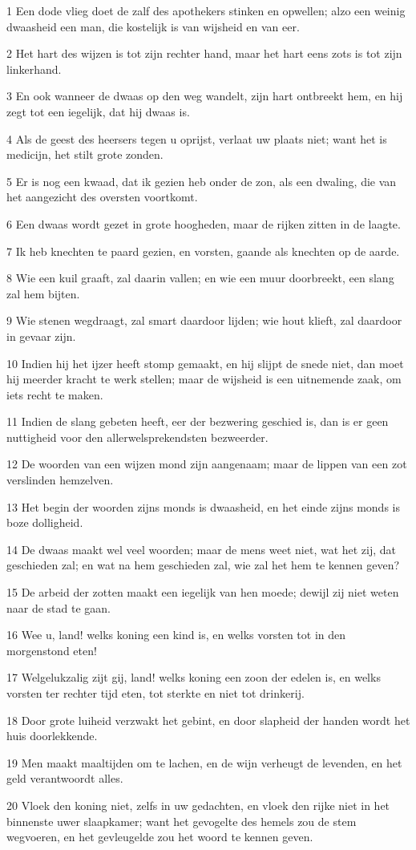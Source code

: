 \par 1 Een dode vlieg doet de zalf des apothekers stinken en opwellen; alzo een weinig dwaasheid een man, die kostelijk is van wijsheid en van eer.
\par 2 Het hart des wijzen is tot zijn rechter hand, maar het hart eens zots is tot zijn linkerhand.
\par 3 En ook wanneer de dwaas op den weg wandelt, zijn hart ontbreekt hem, en hij zegt tot een iegelijk, dat hij dwaas is.
\par 4 Als de geest des heersers tegen u oprijst, verlaat uw plaats niet; want het is medicijn, het stilt grote zonden.
\par 5 Er is nog een kwaad, dat ik gezien heb onder de zon, als een dwaling, die van het aangezicht des oversten voortkomt.
\par 6 Een dwaas wordt gezet in grote hoogheden, maar de rijken zitten in de laagte.
\par 7 Ik heb knechten te paard gezien, en vorsten, gaande als knechten op de aarde.
\par 8 Wie een kuil graaft, zal daarin vallen; en wie een muur doorbreekt, een slang zal hem bijten.
\par 9 Wie stenen wegdraagt, zal smart daardoor lijden; wie hout klieft, zal daardoor in gevaar zijn.
\par 10 Indien hij het ijzer heeft stomp gemaakt, en hij slijpt de snede niet, dan moet hij meerder kracht te werk stellen; maar de wijsheid is een uitnemende zaak, om iets recht te maken.
\par 11 Indien de slang gebeten heeft, eer der bezwering geschied is, dan is er geen nuttigheid voor den allerwelsprekendsten bezweerder.
\par 12 De woorden van een wijzen mond zijn aangenaam; maar de lippen van een zot verslinden hemzelven.
\par 13 Het begin der woorden zijns monds is dwaasheid, en het einde zijns monds is boze dolligheid.
\par 14 De dwaas maakt wel veel woorden; maar de mens weet niet, wat het zij, dat geschieden zal; en wat na hem geschieden zal, wie zal het hem te kennen geven?
\par 15 De arbeid der zotten maakt een iegelijk van hen moede; dewijl zij niet weten naar de stad te gaan.
\par 16 Wee u, land! welks koning een kind is, en welks vorsten tot in den morgenstond eten!
\par 17 Welgelukzalig zijt gij, land! welks koning een zoon der edelen is, en welks vorsten ter rechter tijd eten, tot sterkte en niet tot drinkerij.
\par 18 Door grote luiheid verzwakt het gebint, en door slapheid der handen wordt het huis doorlekkende.
\par 19 Men maakt maaltijden om te lachen, en de wijn verheugt de levenden, en het geld verantwoordt alles.
\par 20 Vloek den koning niet, zelfs in uw gedachten, en vloek den rijke niet in het binnenste uwer slaapkamer; want het gevogelte des hemels zou de stem wegvoeren, en het gevleugelde zou het woord te kennen geven.

